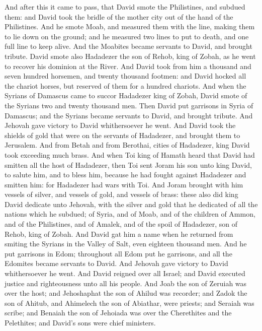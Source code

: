 And after this it came to pass, that David smote the Philistines, and subdued them: and David took the bridle of the mother city out of the hand of the Philistines.  And he smote Moab, and measured them with the line, making them to lie down on the ground; and he measured two lines to put to death, and one full line to keep alive. And the Moabites became servants to David, and brought tribute.  David smote also Hadadezer the son of Rehob, king of Zobah, as he went to recover his dominion at the River. And David took from him a thousand and seven hundred horsemen, and twenty thousand footmen: and David hocked all the chariot horses, but reserved of them for a hundred chariots. And when the Syrians of Damascus came to succor Hadadezer king of Zobah, David smote of the Syrians two and twenty thousand men. Then David put garrisons in Syria of Damascus; and the Syrians became servants to David, and brought tribute. And Jehovah gave victory to David whithersoever he went. And David took the shields of gold that were on the servants of Hadadezer, and brought them to Jerusalem. And from Betah and from Berothai, cities of Hadadezer, king David took exceeding much brass.  And when Toi king of Hamath heard that David had smitten all the host of Hadadezer, then Toi sent Joram his son unto king David, to salute him, and to bless him, because he had fought against Hadadezer and smitten him: for Hadadezer had wars with Toi. And Joram brought with him vessels of silver, and vessels of gold, and vessels of brass: these also did king David dedicate unto Jehovah, with the silver and gold that he dedicated of all the nations which he subdued; of Syria, and of Moab, and of the children of Ammon, and of the Philistines, and of Amalek, and of the spoil of Hadadezer, son of Rehob, king of Zobah.  And David gat him a name when he returned from smiting the Syrians in the Valley of Salt, even eighteen thousand men. And he put garrisons in Edom; throughout all Edom put he garrisons, and all the Edomites became servants to David. And Jehovah gave victory to David whithersoever he went.  And David reigned over all Israel; and David executed justice and righteousness unto all his people. And Joab the son of Zeruiah was over the host; and Jehoshaphat the son of Ahilud was recorder; and Zadok the son of Ahitub, and Ahimelech the son of Abiathar, were priests; and Seraiah was scribe; and Benaiah the son of Jehoiada was over the Cherethites and the Pelethites; and David’s sons were chief ministers. 

